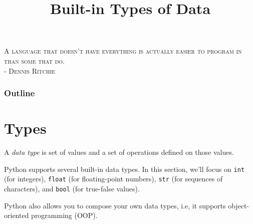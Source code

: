 \documentclass[8pt,a4paper,compress,handout]{beamer}
\title{Built-in Types of Data}
\date{}
\begin{document}
\begin{frame}
\begin{flushright}
\tiny \textsc{A language that doesn't have everything is actually easier to program in than some that do. \\ - Dennis Ritchie}
\end{flushright}
\titlepage
\end{frame}

\begin{frame}
\frametitle{Outline}
\tableofcontents
\end{frame}

\section{Types}
\begin{frame}[fragile]
A \emph{data type} is set of values and a set of operations defined on those values.

\bigskip

Python supports several built-in data types. In this section, we'll focus on \lstinline{int} (for integers), \lstinline{float} (for floating-point numbers), \lstinline{str} (for sequences of characters), and \lstinline{bool} (for true-false values).

\bigskip

Python also allows you to compose your own data types, i.e, it supports object-oriented programming (OOP).
\end{frame}
\end{document}
